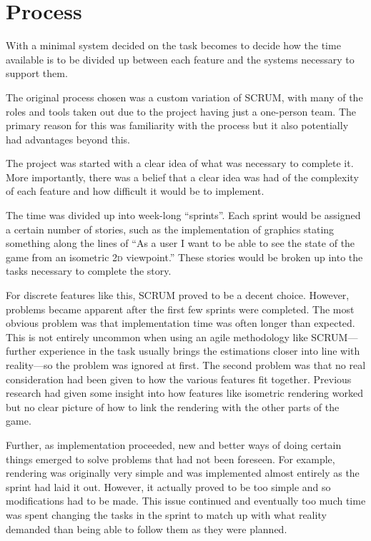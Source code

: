 

\section{Process}
With a minimal system decided on the task becomes to decide how the time available is to be divided up between each feature and the systems necessary to support them.

The original process chosen was a custom variation of SCRUM, with many of the roles and tools taken out due to the project having just a one-person team. The primary reason for this was familiarity with the process but it also potentially had advantages beyond this.

The project was started with a clear idea of what was necessary to complete it. More importantly, there was a belief that a clear idea was had of the complexity of each feature and how difficult it would be to implement.

The time was divided up into week-long ``sprints''. Each sprint would be assigned a certain number of stories, such as the implementation of graphics stating something along the lines of ``As a user I want to be able to see the state of the game from an isometric \textsc{2d} viewpoint.'' These stories would be broken up into the tasks necessary to complete the story.

For discrete features like this, SCRUM proved to be a decent choice. However, problems became apparent after the first few sprints were completed. The most obvious problem was that implementation time was often longer than expected. This is not entirely uncommon when using an agile methodology like SCRUM---further experience in the task usually brings the estimations closer into line with reality---so the problem was ignored at first. The second problem was that no real consideration had been given to how the various features fit together. Previous research had given some insight into how features like isometric rendering worked but no clear picture of how to link the rendering with the other parts of the game.

Further, as implementation proceeded, new and better ways of doing certain things emerged to solve problems that had not been foreseen. For example, rendering was originally very simple and was implemented almost entirely as the sprint had laid it out. However, it actually proved to be too simple and so modifications had to be made. This issue continued and eventually too much time was spent changing the tasks in the sprint to match up with what reality demanded than being able to follow them as they were planned.

